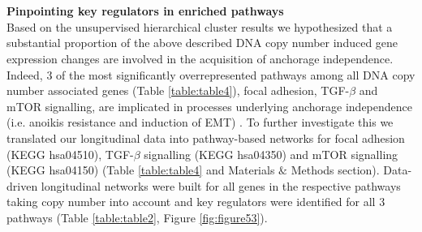 \\
\\
\textbf{Pinpointing key regulators in enriched pathways}
\\
Based on the unsupervised hierarchical cluster results we hypothesized that a substantial proportion of the above described DNA copy number induced gene expression changes are involved in the acquisition of anchorage independence. Indeed, 3 of the most significantly overrepresented pathways among all DNA copy number associated genes (Table \ref{table:table4}), focal adhesion, TGF-$\beta$ and mTOR signalling, are implicated in processes underlying anchorage independence (i.e. anoikis resistance and induction of EMT) \cite{Paoli2013, Frisch2013}. To further investigate this we translated our longitudinal data into pathway-based networks for focal adhesion (KEGG hsa04510), TGF-$\beta$ signalling (KEGG hsa04350) and mTOR signalling (KEGG hsa04150) (Table \ref{table:table4} and Materials $\&$ Methods section). Data-driven longitudinal networks were built for all genes in the respective pathways taking copy number into account and key regulators were identified for all 3 pathways (Table \ref{table:table2}, Figure \ref{fig:figure53}).%
